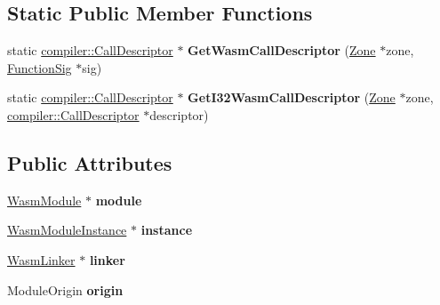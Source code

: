 \subsection*{Static Public Member Functions}
\begin{DoxyCompactItemize}
\item 
static \hyperlink{classv8_1_1internal_1_1compiler_1_1_call_descriptor}{compiler\+::\+Call\+Descriptor} $\ast$ {\bfseries Get\+Wasm\+Call\+Descriptor} (\hyperlink{classv8_1_1internal_1_1_zone}{Zone} $\ast$zone, \hyperlink{classv8_1_1internal_1_1_signature}{Function\+Sig} $\ast$sig)\hypertarget{structv8_1_1internal_1_1wasm_1_1_module_env_a20118fb8c46e5e61ccd76200e56b8d05}{}\label{structv8_1_1internal_1_1wasm_1_1_module_env_a20118fb8c46e5e61ccd76200e56b8d05}

\item 
static \hyperlink{classv8_1_1internal_1_1compiler_1_1_call_descriptor}{compiler\+::\+Call\+Descriptor} $\ast$ {\bfseries Get\+I32\+Wasm\+Call\+Descriptor} (\hyperlink{classv8_1_1internal_1_1_zone}{Zone} $\ast$zone, \hyperlink{classv8_1_1internal_1_1compiler_1_1_call_descriptor}{compiler\+::\+Call\+Descriptor} $\ast$descriptor)\hypertarget{structv8_1_1internal_1_1wasm_1_1_module_env_ac238ad8dc13ccea1304680c52ff35b86}{}\label{structv8_1_1internal_1_1wasm_1_1_module_env_ac238ad8dc13ccea1304680c52ff35b86}

\end{DoxyCompactItemize}
\subsection*{Public Attributes}
\begin{DoxyCompactItemize}
\item 
\hyperlink{structv8_1_1internal_1_1wasm_1_1_wasm_module}{Wasm\+Module} $\ast$ {\bfseries module}\hypertarget{structv8_1_1internal_1_1wasm_1_1_module_env_a9ae83eca63305b1526303d9817f21ea9}{}\label{structv8_1_1internal_1_1wasm_1_1_module_env_a9ae83eca63305b1526303d9817f21ea9}

\item 
\hyperlink{structv8_1_1internal_1_1wasm_1_1_wasm_module_instance}{Wasm\+Module\+Instance} $\ast$ {\bfseries instance}\hypertarget{structv8_1_1internal_1_1wasm_1_1_module_env_aeacd0f681785d88d3e441bd3f76d06a6}{}\label{structv8_1_1internal_1_1wasm_1_1_module_env_aeacd0f681785d88d3e441bd3f76d06a6}

\item 
\hyperlink{classv8_1_1internal_1_1wasm_1_1_wasm_linker}{Wasm\+Linker} $\ast$ {\bfseries linker}\hypertarget{structv8_1_1internal_1_1wasm_1_1_module_env_a227b56f144e800c8c2d75f46bad788d8}{}\label{structv8_1_1internal_1_1wasm_1_1_module_env_a227b56f144e800c8c2d75f46bad788d8}

\item 
Module\+Origin {\bfseries origin}\hypertarget{structv8_1_1internal_1_1wasm_1_1_module_env_a86aa0f191cf350c36af48f267a5c8f5b}{}\label{structv8_1_1internal_1_1wasm_1_1_module_env_a86aa0f191cf350c36af48f267a5c8f5b}

\end{DoxyCompactItemize}


